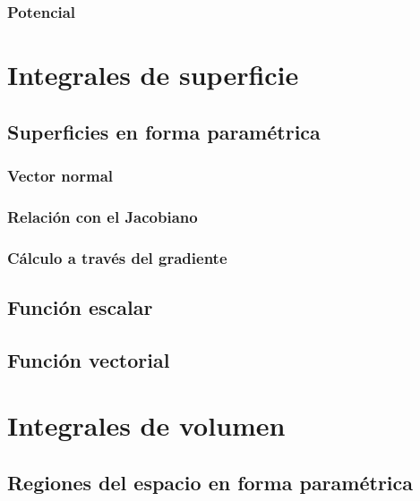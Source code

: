 \documentclass[12pt, fleqn]{report}                             %
\begin{document}
                \subsubsection{Potencial}
        
        \section{Integrales de superficie}
        
            \subsection{Superficies en forma paramétrica}
            
                \subsubsection{Vector normal}
            
                \subsubsection{Relación con el Jacobiano}
                
                \subsubsection{Cálculo a través del gradiente}
            
            \subsection{Función escalar}
            
            \subsection{Función vectorial}
        
        \section{Integrales de volumen}
        
            \subsection{Regiones del espacio en forma paramétrica}
            
\end{document}

